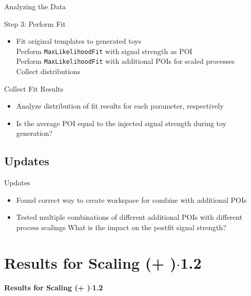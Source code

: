 \begin{frame}{Analyzing the Data}

\begin{block}{Step 3: Perform Fit}
\begin{itemize}
\item Fit original templates to generated toys\\
\rar Perform \texttt{MaxLikelihoodFit} with signal strength as POI\\
\rar Perform \texttt{MaxLikelihoodFit} with additional POIs for scaled processes\\
\rar Collect distributions
\end{itemize}
\end{block}

\begin{block}{Collect Fit Results}
\begin{itemize}
\item Analyze distribution of fit results for each parameter, respectively
\item Is the average POI equal to the injected signal strength during toy generation? 
\end{itemize}
\end{block}

\end{frame}

\subsection{Updates}

\begin{frame}{Updates}
\begin{itemize}
\item Found correct way to create workspace for combine with additional POIs\\
\item Tested multiple combinations of different additional POIs with different process scalings
\rar What is the impact on the postfit signal strength?
\end{itemize}

\end{frame}

\section{Results for Scaling (\ttbar + \bbbar)$\cdot$\num[round-precision=1]{1.2}}

\begin{frame}
\centering
\begin{huge}
\textbf{Results for Scaling (\ttbar + \bbbar)$\cdot$\num[round-precision=1]{1.2}}
\end{huge}

\end{frame}

